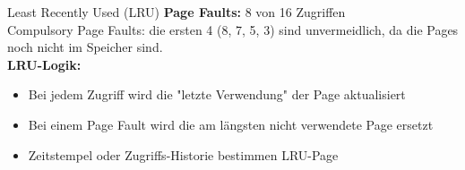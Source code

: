 \begin{example2}{Least Recently Used (LRU)}
    \textbf{Page Faults:} 8 von 16 Zugriffen\\
    Compulsory Page Faults: die ersten 4 (8, 7, 5, 3) sind unvermeidlich, da die Pages noch nicht im Speicher sind.\\
    
    \textbf{LRU-Logik:}
    \begin{itemize}
        \item Bei jedem Zugriff wird die "letzte Verwendung" der Page aktualisiert
        \item Bei einem Page Fault wird die am längsten nicht verwendete Page ersetzt
        \item Zeitstempel oder Zugriffs-Historie bestimmen LRU-Page
    \end{itemize}
\end{example2}

